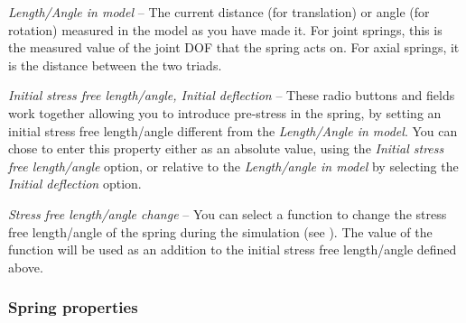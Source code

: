 \begin{bulletlist}
\item{\sl Length/Angle in model} --
  The current distance (for translation) or angle (for rotation) measured in
  the model as you have made it. For joint springs, this is the measured value
  of the joint DOF that the spring acts on. For axial springs,
  it is the distance between the two triads.

\item{\sl Initial stress free length/angle, Initial deflection} --
  These radio buttons and fields work together allowing you to introduce
  pre-stress in the spring, by setting an initial stress free length/angle
  different from the {\sl Length/Angle in model}.
  You can chose to enter this property either as an absolute value, using the
  {\sl Initial stress free length/angle} option, or relative to the
  {\sl Length/angle in model} by selecting the {\sl Initial deflection} option.



\item{\sl Stress free length/angle change} --
  You can select a function to change the stress free length/angle of the spring
  during the simulation (see ).
  The value of the function will be used as an addition to the initial stress
  free length/angle defined above.

\end{bulletlist}


\subsubsection{Spring properties}

